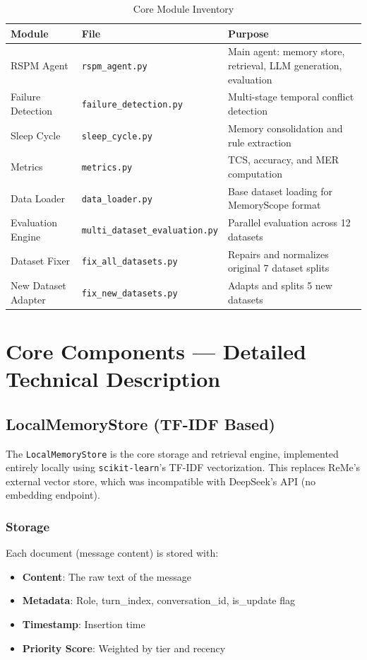 \documentclass[11pt,a4paper]{article}
\begin{document}
\begin{table}[H]
\centering
\caption{Core Module Inventory}
\begin{tabular}{@{}llp{7cm}@{}}
\toprule
\textbf{Module} & \textbf{File} & \textbf{Purpose} \\
\midrule
RSPM Agent & \texttt{rspm\_agent.py} & Main agent: memory store, retrieval, LLM generation, evaluation \\
Failure Detection & \texttt{failure\_detection.py} & Multi-stage temporal conflict detection \\
Sleep Cycle & \texttt{sleep\_cycle.py} & Memory consolidation and rule extraction \\
Metrics & \texttt{metrics.py} & TCS, accuracy, and MER computation \\
Data Loader & \texttt{data\_loader.py} & Base dataset loading for MemoryScope format \\
Evaluation Engine & \texttt{multi\_dataset\_evaluation.py} & Parallel evaluation across 12 datasets \\
Dataset Fixer & \texttt{fix\_all\_datasets.py} & Repairs and normalizes original 7 dataset splits \\
New Dataset Adapter & \texttt{fix\_new\_datasets.py} & Adapts and splits 5 new datasets \\
\bottomrule
\end{tabular}
\end{table}

\section{Core Components --- Detailed Technical Description}

\subsection{LocalMemoryStore (TF-IDF Based)}

The \texttt{LocalMemoryStore} is the core storage and retrieval engine, implemented entirely locally using \texttt{scikit-learn}'s TF-IDF vectorization. This replaces ReMe's external vector store, which was incompatible with DeepSeek's API (no embedding endpoint).

\subsubsection{Storage}
Each document (message content) is stored with:
\begin{itemize}
    \item \textbf{Content}: The raw text of the message
    \item \textbf{Metadata}: Role, turn\_index, conversation\_id, is\_update flag
    \item \textbf{Timestamp}: Insertion time
    \item \textbf{Priority Score}: Weighted by tier and recency
\end{itemize}
\end{document}
